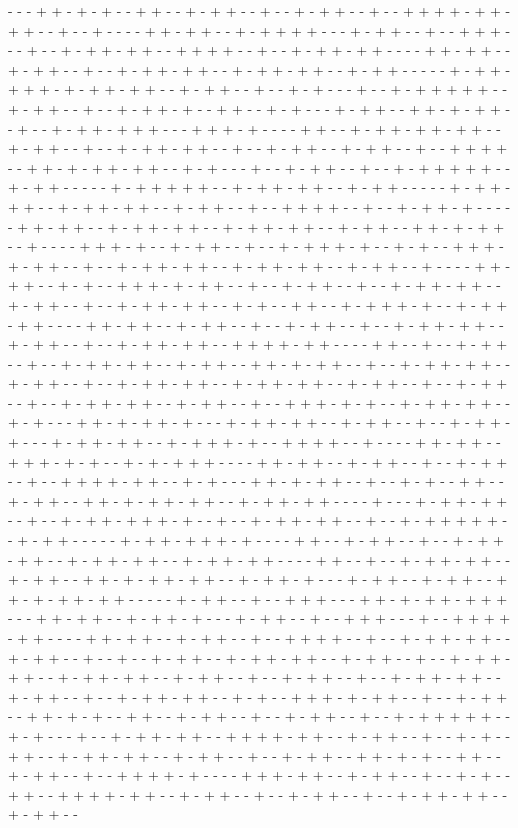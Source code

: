 - - - + + - + - + - - + + - - + - + + - - + - - + - + + - - + - - + + + + - + + - + + - - + - - + - - - - + + - + + - - + - + + + + - - - + - + + - - + - - + + + - - - + - - + - + + - + + - - + + + + - - + - - + - + + - + + - - - - + + - + + - - + - + + - - + - - + - + + - + + - - + - + + - + + - - + - + + - - - - - + - + + - + + + - + - + + - + + - - + - + + - - + - - + - + - - - + - - + - + + + + + - - + - + + - - + - - + - + + - + - - + + - - + - + - - - + - + + - - + + - + - + + - - + - - + - + + - + + + - - - + + + - + - - - - + + - - + - + + - + + - + + - - + - + + - - + - - + - + + - + + - - + - - + - + + - - + - + + - - + - - + + + + - - + + - + - + + - + + - - + - + - - - + - - + - + + - - + - - + - + + + + + - - + - + + - - - - - + - + + + + + - - + - + + - + + - - + - + + - - - - - + - + + - + + - - + - + + - + + - - + - + + - - + - - + + + + - - + - - + - + + - + - - - - - + + - + + - - + - + + - + + - - + - + + - + + - - + - + + - - + + - + - + + - - + - - - - + + + - + - - + - + + - - + - - + - + + + - + - - + - + - - + + + - + - + + - - + - - + - + + - + + - - + - + + - + + - - + - + + - - + - - - - + + - + + - - + - + - - + + + - + - + + - - + - - + - + + - - + - - + - + + - + + - - + - + + - - + - - + - + + - + + - - + - + - - + + - - + - + + + - + - - + - + + - + + - - - - + + - + + - - + - + + - - + - - + - + + - - + - - + - + + - + + - - + - + + - - + - - + - + + - + + - - + + + + - + + - - - - + + - - + - - + - + + - - + - - + - + + - + + - - + - + + - - + + - + - + + - - + - - + - + + - + + - - + - + + - - + - - + - + + - + + - - + - + + - + + - - + - + + - - + - - + - + + - - + - - + - + + - + + - - + - + + - - + - - + + + - + - + - - + - + + - + + - - + - + - - - + + - + - + + - + - - - + - + + - + + - - + - + + - - + - - + - + + - + - - - + - + + - + + - - + - + + + - + - - + + + + - - + - - - - + + - + + - - + + + - + - + - - + - + - + + + - - - - + + - + + - - + - + + - - + - - + - + + - - + - - + + + + - + + - - + - + - - - + + - + - + + - - + - - + - + - - + + - - + - + + - - + + - + - + + - + + - - + - + + - + + - - - - + - - - + - + + - + + - - + - - + - + + - + + + - + - - + - - + - + + - + + - - + - - + - + + + + + - - + - + + - - - - - + - + + - + + + - + - - - - + + - - + - + + - - + - - + - + + - + + - - + - + + - + + - - + - + + - + + - - - - + + - - + - - + - + + - + + - - + - + + - - + + - + - + + - + + - - + - + + - + - - - + - + + - - + - + + - - + + - + - + + - + + - - - - - + - + + - - + - - + + + - - - + + - + - + + - + + + - - - + + - + + - - + - + + - + - - - + - + + - - + - - + + + - - - + - - + + + + - + + - - - - + + - + + - - + - + + - - + - - + + + + - - + - - + - + + - + + - - + - + + - - + - - + - - + - + + - - + - + + - + + - - + - + + - - + - - + - + + - + + - - + - + + - + + - - + - + + - - + - - + - + + - - + - - + - + + - + + - - + - + + - - + - - + - + + - + + - - + - + - - + + + - + - + + - - + - - + - + + - - + + - + - + - - + + - - + - + + - - + - - + - + + - - + - - + - + + + + + - - + - + - - - + - - + - + + - + + - - + + + + - + + - - + - + + - - + - - + - + - - + + - - + - + + - + + - - + - + + - - + - - + - + + - - + + - + - + - - + + - - + - + + - - + - - + + + + - + - - - - + + + - + + - - + - + + - - + - - + - + - - + + - - + + + + - + + - - + - + + - - + - - + - + + - - + - - + - + + - + + - - + - + + - - 